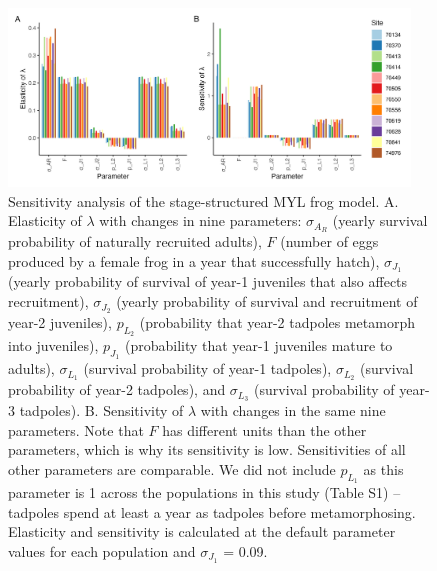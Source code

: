 \documentclass[9pt,twoside,lineno]{pnas-new-SI}
\begin{document}
\begin{figure}

{\centering \includegraphics[width=0.95\textwidth]{figures/pop_viability_figures_for_supp.jpg}

}

\caption{\label{fig-viability-supp}Sensitivity analysis of the
stage-structured MYL frog model. A. Elasticity of \(\lambda\) with
changes in nine parameters: \(\sigma_{A_R}\) (yearly survival
probability of naturally recruited adults), \(F\) (number of eggs
produced by a female frog in a year that successfully hatch),
\(\sigma_{J_1}\) (yearly probability of survival of year-1 juveniles
that also affects recruitment), \(\sigma_{J_2}\) (yearly probability of
survival and recruitment of year-2 juveniles), \(p_{L_2}\) (probability
that year-2 tadpoles metamorph into juveniles), \(p_{J_1}\) (probability
that year-1 juveniles mature to adults), \(\sigma_{L_1}\) (survival
probability of year-1 tadpoles), \(\sigma_{L_2}\) (survival probability
of year-2 tadpoles), and \(\sigma_{L_3}\) (survival probability of
year-3 tadpoles). B. Sensitivity of \(\lambda\) with changes in the same
nine parameters. Note that \(F\) has different units than the other
parameters, which is why its sensitivity is low. Sensitivities of all
other parameters are comparable. We did not include \(p_{L_1}\) as this
parameter is 1 across the populations in this study (Table S1) --
tadpoles spend at least a year as tadpoles before metamorphosing.
Elasticity and sensitivity is calculated at the default parameter values
for each population and \(\sigma_{J_1}\) = 0.09.}

\end{figure}\clearpage

\newpage
\end{document}
